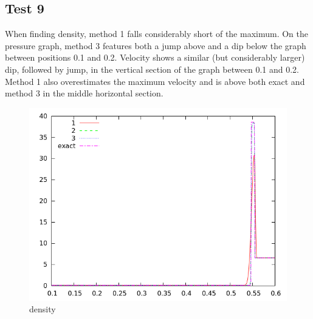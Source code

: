\documentclass[10pt,preprint]{aastex}
\begin{document}
\clearpage

\subsection{Test 9}
When finding density, method 1 falls considerably short of the maximum. On the pressure graph, method 3 features both a jump above and a dip below the graph between positions 0.1 and 0.2. Velocity shows a similar (but considerably larger) dip, followed by jump, in the vertical section of the graph between 0.1 and 0.2. Method 1 also overestimates the maximum velocity and is above both exact and method 3 in the middle horizontal section. 


\begin{figure}[h]
  \begin{center}
     \includegraphics[width=.78\textwidth]{den_T9.png}	
  \end{center}
  \caption{density}
\end{figure}
\end{document}
